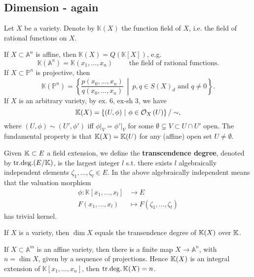 \subsection{Dimension - again}
\begin{rem}[]
	Let $X$ be a variety.
	Denote by $\mathbb{K}(X)$ the function field of $X$, i.e. the field
	of rational functions on $X$.

	If $X \subset \mathbb{A}^{n}$ is affine, then $\mathbb{K}(X) = Q(\mathbb{K}[X])$,
	e.g.
	\begin{equation}
		\mathbb{K}(\mathbb{A}^{n}) = \mathbb{K}(x_1, \ldots, x_n) \qquad \text{ the field of rational functions}
	.\end{equation} 
	If $X \subset \mathbb{P}^{n}$ is projective, then
	\begin{equation}
		\mathbb{K}(\mathbb{P}^{n}) = \left\{ 
		\frac{p(x_0, \ldots, x_n)}{q(x_0, \ldots, x_n)} \ \middle|\ p, q \in S(X)_d \text{ and } 
	q \neq 0\right\}
	.\end{equation} 
	If $X$ is an arbitrary variety, by ex. 6, ex-sh 3, we have
	\begin{equation}
		\K(X) = \left\{  \left(U, \phi\right) \ \middle|\ 
		\phi \in \mathcal{O}_{X} \left( U \right) \right\}/\sim
	,\end{equation} 
	where $\left(U, \phi\right) \sim \left(U', \phi'\right)$ iff $\left.\phi\right|_{V} = \left.\phi'\right|_{V}$ for some 
	$\emptyset \subsetneq V \subset U \cap U'$ open.
	The fundamental property is that $\mathbb{K}(X) = \mathbb{K}(U)$ for any (affine) open set $U \neq \emptyset$.
\end{rem}

\begin{defn}
	Given $\mathbb{K} \subset E$ a field extension, we define the \textbf{transcendence degree}, 
	denoted by $\mathrm{tr.deg.}(E/\mathbb{K})$, is the largest integer $l$ s.t.
	there exists $l$ algebraically independent elements $\zeta_1, \ldots, \zeta_l \in E$.
	In the above algebraically independent means that the valuation morphism
	\begin{align}
		\phi: \mathbb{K}\left[x_1, \ldots, x_l \right] &\to E \\
		F(x_1, \ldots, x_l) &\mapsto F(\zeta_1, \ldots, \zeta_l)
	\end{align} 
	has trivial kernel.
\end{defn}

\begin{thm}[]
	If $X$ is a variety, then $\dim X$ equals the 
	transendence degree of $\mathbb{K}(X)$ over $\mathbb{K}$.
\end{thm}

\begin{rem}[]
	If $X \subset \mathbb{A}^{m}$ is an affine variety, then there is a finite map
	$X \to \mathbb{A}^{n}$, with $n = \dim X$, given by a sequence of
	projections.
	Hence $\mathbb{K}(X)$ is an integral extension of $\mathbb{K}\left[x_1, \ldots, x_n \right]$, then
	$\mathrm{tr.deg.}\, \mathbb{K}(X) = n$.
\end{rem}

